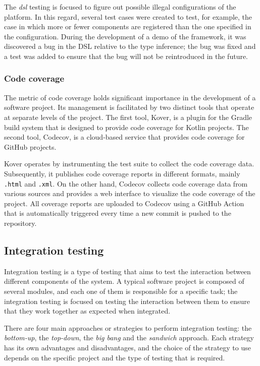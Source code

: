 The \emph{dsl} testing is focused to figure out possible illegal configurations of the platform. In this regard, several test cases were
created to test, for example, the case in which more or fewer components are registered than the one specified in the configuration.
During the development of a demo of the framework, it was discovered a bug in the DSL relative to the type inference; the bug was fixed and a test
was added to ensure that the bug will not be reintroduced in the future.

\subsubsection{Code coverage}

The metric of code coverage holds significant importance in the development of a software project. Its management is facilitated by two distinct
tools that operate at separate levels of the project. The first tool, Kover, is a plugin for the Gradle build system that is designed to provide code
coverage for Kotlin projects. The second tool, Codecov, is a cloud-based service that provides code coverage for GitHub projects.

Kover operates by instrumenting the test suite to collect the code coverage data. Subsequently, it publishes code coverage
reports in different formats, mainly \texttt{.html} and \texttt{.xml}. On the other hand, Codecov collects code coverage data from various sources and provides a web
interface to visualize the code coverage of the project. All coverage reports are uploaded to Codecov using a GitHub Action that is automatically
triggered every time a new commit is pushed to the repository.

\subsection{Integration testing}
\label{sec:integration-testing}

Integration testing is a type of testing that aims to test the interaction between different components of the system.
A typical software project is composed of several modules, and each one of them is responsible for a specific task; the integration testing
is focused on testing the interaction between them to ensure that they work together as expected when integrated.

There are four main approaches or strategies to perform integration testing: the \emph{bottom-up}, the \emph{top-down}, the \emph{big bang} and
the \emph{sandwich} approach. Each strategy has its own advantages and disadvantages, and the choice of the strategy to use depends on the
specific project and the type of testing that is required.

